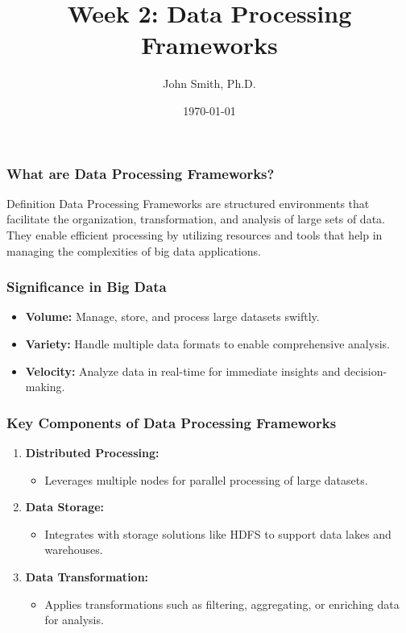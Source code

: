 \documentclass[aspectratio=169]{beamer}
\title[Week 2: Data Processing Frameworks]{Week 2: Data Processing Frameworks}
\author[J. Smith]{John Smith, Ph.D.}
\institute[University Name]{
  Department of Computer Science\\
  University Name\\
  Email: email@university.edu\\
  Website: www.university.edu
}
\date{\today}
\begin{document}
\frame{\titlepage}

\begin{frame}[fragile]
    \titlepage
\end{frame}

\begin{frame}[fragile]
    \frametitle{What are Data Processing Frameworks?}
    \begin{block}{Definition}
        Data Processing Frameworks are structured environments that facilitate the organization, transformation, and analysis of large sets of data. They enable efficient processing by utilizing resources and tools that help in managing the complexities of big data applications.
    \end{block}
\end{frame}

\begin{frame}[fragile]
    \frametitle{Significance in Big Data}
    \begin{itemize}
        \item \textbf{Volume:} Manage, store, and process large datasets swiftly.
        \item \textbf{Variety:} Handle multiple data formats to enable comprehensive analysis.
        \item \textbf{Velocity:} Analyze data in real-time for immediate insights and decision-making.
    \end{itemize}
\end{frame}

\begin{frame}[fragile]
    \frametitle{Key Components of Data Processing Frameworks}
    \begin{enumerate}
        \item \textbf{Distributed Processing:} 
        \begin{itemize}
            \item Leverages multiple nodes for parallel processing of large datasets.
        \end{itemize}
        \item \textbf{Data Storage:} 
        \begin{itemize}
            \item Integrates with storage solutions like HDFS to support data lakes and warehouses.
        \end{itemize}
        \item \textbf{Data Transformation:} 
        \begin{itemize}
            \item Applies transformations such as filtering, aggregating, or enriching data for analysis.
        \end{itemize}
    \end{enumerate}
\end{frame}
\end{document}
